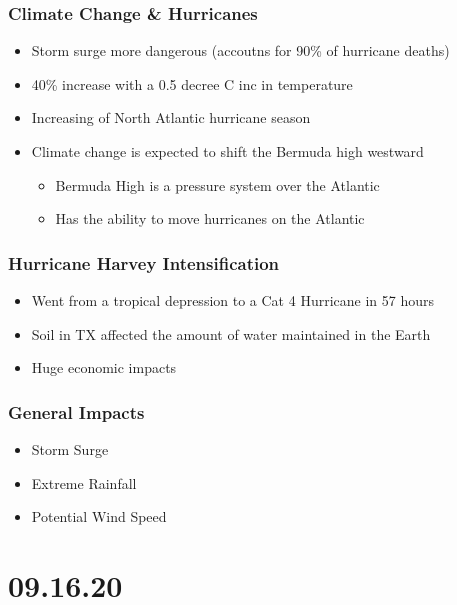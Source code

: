 \documentclass[11pt]{article}
\begin{document}
\subsubsection{Climate Change \& Hurricanes}
\label{sec:org06cabcf}
\begin{itemize}
\item Storm surge more dangerous (accoutns for 90\% of hurricane deaths)
\item 40\% increase with a 0.5 decree C inc in temperature
\item Increasing of North Atlantic hurricane season
\item Climate change is expected to shift the Bermuda high westward
\begin{itemize}
\item Bermuda High is a pressure system over the Atlantic
\item Has the ability to move hurricanes on the Atlantic
\end{itemize}
\end{itemize}
\subsubsection{Hurricane Harvey Intensification}
\label{sec:org289c1f5}
\begin{itemize}
\item Went from a tropical depression to a Cat 4 Hurricane in 57 hours
\item Soil in TX affected the amount of water maintained in the Earth
\item Huge economic impacts
\end{itemize}
\subsubsection{General Impacts}
\label{sec:org5a2906a}
\begin{itemize}
\item Storm Surge
\item Extreme Rainfall
\item Potential Wind Speed
\end{itemize}
\section{09.16.20}
\label{sec:org3395aa3}
\end{document}
